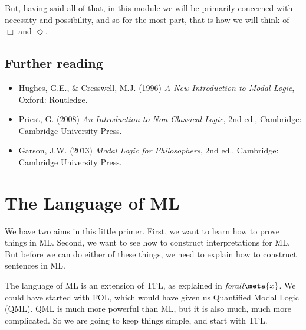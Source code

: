 But, having said all of that, in this module we will be primarily concerned with necessity and possibility, and so for the most part, that is how we will think of $\Box$ and $\Diamond$.


\section*{Further reading}
\begin{itemize}
\item Hughes, G.E., \& Cresswell, M.J. (1996) \emph{A New Introduction to Modal Logic}, Oxford: Routledge.
\item Priest, G. (2008) \emph{An Introduction to Non-Classical Logic}, 2nd ed., Cambridge: Cambridge University Press.
\item Garson, J.W. (2013) \emph{Modal Logic for Philosophers}, 2nd ed., Cambridge: Cambridge University Press.
\end{itemize}



\chapter{The Language of ML}
\label{TFLtoML}

We have two aims in this little primer. First, we want to learn how to prove things in ML. Second, we want to see how to construct interpretations for ML. But before we can do either of these things, we need to explain how to construct sentences in ML.

The language of ML is an extension of TFL, as explained in \emph{forall}$\meta{x}$. We could have started with FOL, which would have given us Quantified Modal Logic (QML). QML is much more powerful than ML, but it is also much, much more complicated. So we are going to keep things simple, and start with TFL.

